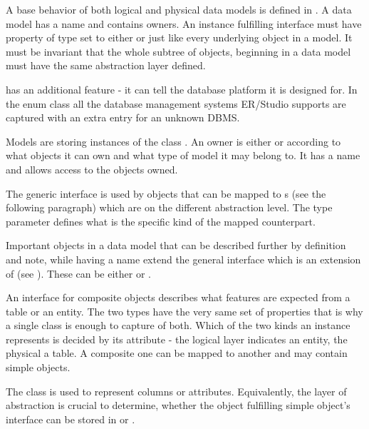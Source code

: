 A base behavior of both logical and physical data models is defined in .
A data model has a name and contains owners. An instance fulfilling  interface must have property of type  set to either  or  just like every underlying object in a model.
It must be invariant that the whole subtree of objects, beginning in a data model must have the same abstraction layer defined.

 has an additional feature - it can tell the database platform it is designed for. 
In the enum class  all the database management systems ER/Studio supports are captured with an extra entry for an unknown DBMS.

Models are storing instances of the class . An owner is either  or  according to what objects it can own and what type of model it may belong to. 
It has a name and allows access to the objects owned.

The generic interface  is used by objects that can be mapped to s (see the following paragraph) which are on the different abstraction level. The type parameter defines what is the specific kind of the mapped counterpart.

Important objects in a data model that can be described further by definition and note, while having a name extend the general  interface which is an extension of  (see ). 
These can be either  or .

An interface for composite objects describes what features are expected from a table or an entity.
The two types have the very same set of properties that is why a single class is enough to capture of both. 
Which of the two kinds an instance represents is decided by its  attribute - the logical layer indicates an entity, the physical a table.
A composite one can be mapped to another  and may contain simple objects.

The  class is used to represent columns or attributes. Equivalently, the layer of abstraction is crucial to determine, whether the object fulfilling simple object's interface can be stored in  or .

